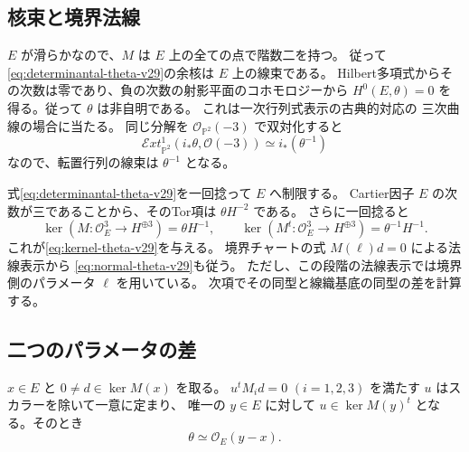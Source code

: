 \subsection{核束と境界法線}

$E$ が滑らかなので、$M$ は $E$ 上の全ての点で階数二を持つ。
従って\eqref{eq:determinantal-theta-v29}の余核は $E$ 上の線束である。
Hilbert多項式からその次数は零であり、負の次数の射影平面のコホモロジーから
$H^0(E,\theta)=0$ を得る。従って $\theta$ は非自明である。
これは一次行列式表示の古典的対応\cite[Proposition~3.1]{BeauvilleDeterminantal}の
三次曲線の場合に当たる。
同じ分解を $\mathcal O_{\mathbb P^2}(-3)$ で双対化すると
\[
 \mathcal Ext^1_{\mathbb P^2}(i_*\theta,\mathcal O(-3))
 \simeq i_*(\theta^{-1})
\]
なので、転置行列の線束は $\theta^{-1}$ となる。

式\eqref{eq:determinantal-theta-v29}を一回捻って $E$ へ制限する。
Cartier因子 $E$ の次数が三であることから、そのTor項は $\theta H^{-2}$ である。
さらに一回捻ると
\[
 \ker(M:\mathcal O_E^3\to H^{\oplus3})=\theta H^{-1},\qquad
 \ker(M^t:\mathcal O_E^3\to H^{\oplus3})=\theta^{-1}H^{-1}.
\]
これが\eqref{eq:kernel-theta-v29}を与える。
境界チャートの式 $M(\ell)d=0$ による法線表示から
\eqref{eq:normal-theta-v29}も従う。
ただし、この段階の法線表示では境界側のパラメータ $\ell$ を用いている。
次項でその同型と線織基底の同型の差を計算する。

\subsection{二つのパラメータの差}

\begin{lemma}[行列式表示の平行移動]
\label{lem:determinantal-translation-v29}
$x\in E$ と $0\ne d\in\ker M(x)$ を取る。
$u^tM_i d=0$ $(i=1,2,3)$ を満たす $u$ はスカラーを除いて一意に定まり、
唯一の $y\in E$ に対して $u\in\ker M(y)^t$ となる。そのとき
\[
 \theta\simeq\mathcal O_E(y-x).
\]
\end{lemma}

